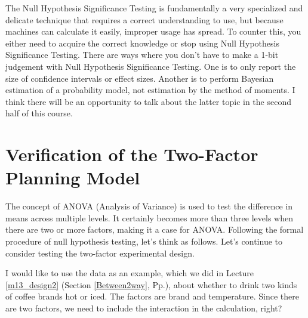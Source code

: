 \documentclass{ltjbook}
\begin{document}
The Null Hypothesis Significance Testing is fundamentally a very specialized and delicate technique that requires a correct understanding to use, but because machines can calculate it easily, improper usage has spread. To counter this, you either need to acquire the correct knowledge or stop using Null Hypothesis Significance Testing. There are ways where you don't have to make a 1-bit judgement with Null Hypothesis Significance Testing. One is to only report the size of confidence intervals or effect sizes. Another is to perform Bayesian estimation of a probability model, not estimation by the method of moments. I think there will be an opportunity to talk about the latter topic in the second half of this course.

\section{Verification of the Two-Factor Planning Model}
The concept of ANOVA (Analysis of Variance) is used to test the difference in means across multiple levels. It certainly becomes more than three levels when there are two or more factors, making it a case for ANOVA. Following the formal procedure of null hypothesis testing, let's think as follows.
Let's continue to consider testing the two-factor experimental design.

I would like to use the data as an example, which we did in Lecture \ref{m13_design2} (Section \ref{Between2way}, Pp.\pageref{Between2way}), about whether to drink two kinds of coffee brands hot or iced.
The factors are brand and temperature. Since there are two factors, we need to include the interaction in the calculation, right?
\end{document}
